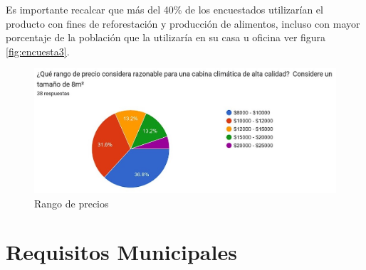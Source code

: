 Es importante recalcar que más del 40\% de los encuestados utilizarían el producto con fines de reforestación y producción de alimentos, incluso con mayor porcentaje de la población que la utilizaría en su casa u oficina ver figura \ref{fig:encuesta3}.

\begin{figure}[H]
    \centering	
    \includegraphics[width=.8\textwidth]{img/Empresa/encuesta4.jpg} 
    \caption{Rango de precios}
\label{fig:encuesta4}
\end{figure}

\section{Requisitos Municipales}
\label{sec:requisitosMunicipales}

